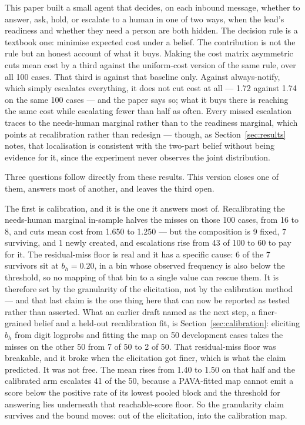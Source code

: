 \documentclass{article}
\begin{document}
This paper built a small agent that decides, on each inbound message, whether to
answer, ask, hold, or escalate to a human in one of two ways, when the lead's
readiness and whether they need a person are both hidden. The decision rule is a
textbook one: minimise expected cost under a belief. The contribution is not the
rule but an honest account of what it buys. Making the cost matrix asymmetric
cuts mean cost by a third against the uniform-cost version of the same rule, over
all 100 cases. That third is against that baseline only. Against always-notify,
which simply escalates everything, it does not cut cost at all --- 1.72 against
1.74 on the same 100 cases --- and the
paper says so; what it buys there is reaching the same cost while escalating fewer
than half as often. Every missed escalation traces to the needs-human marginal
rather than to the readiness marginal, which points at recalibration rather than
redesign --- though, as Section~\ref{sec:results} notes, that localisation is
consistent with the two-part belief without being evidence for it, since the
experiment never observes the joint distribution.

Three questions follow directly from these results. This version closes one of them,
answers most of another, and leaves the third open.

The first is calibration, and it is the one it answers most of. Recalibrating the
needs-human marginal in-sample halves the misses on those 100 cases, from 16 to 8,
and cuts mean cost from 1.650 to 1.250 --- but the composition is 9 fixed, 7
surviving, and 1 newly created, and escalations rise from 43 of 100 to 60 to pay for
it. The residual-miss floor is real and it has a specific cause: 6 of the 7
survivors sit at $b_h = 0.20$, in a bin whose observed frequency is also below the
threshold, so no mapping of that bin to a single value can rescue them. It is
therefore set by the granularity of the elicitation, not by the calibration method
--- and that last claim is the one thing here that can now be reported as tested
rather than asserted. What an earlier draft named as the next step, a finer-grained
belief and a held-out recalibration fit, is Section~\ref{sec:calibration}: eliciting
$b_h$ from digit logprobs and fitting the map on 50 development cases takes the
misses on the other 50 from 7 of 50 to 2 of 50. That residual-miss floor was
breakable, and it broke when the elicitation got finer, which is what the claim
predicted. It was not free. The mean rises from 1.40 to 1.50 on that half and the
calibrated arm escalates 41 of the 50, because a PAVA-fitted map cannot emit a score
below the positive rate of its lowest pooled block and the threshold for answering
lies underneath that reachable-score floor. So the granularity claim survives and
the bound moves: out of the elicitation, into the calibration map.
\end{document}

